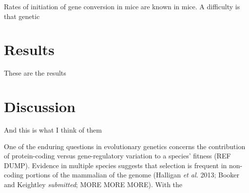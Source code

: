 \documentclass{article}
\begin{document}
	Rates of initiation of gene conversion in mice are known in mice.
A difficulty is that genetic 
 
 

\section*{Results}
These are the results

\section*{Discussion}
And this is what I think of them


One of the enduring questions in evolutionary genetics concerns the contribution of protein-coding versus gene-regulatory variation to a species' fitness (REF DUMP). Evidence in multiple species suggests that selection is frequent in non-coding portions of the mammalian of the genome (Halligan \textit{et al.} 2013; Booker and Keightley \textit{submitted}; MORE MORE MORE). With the 
\end{document}
